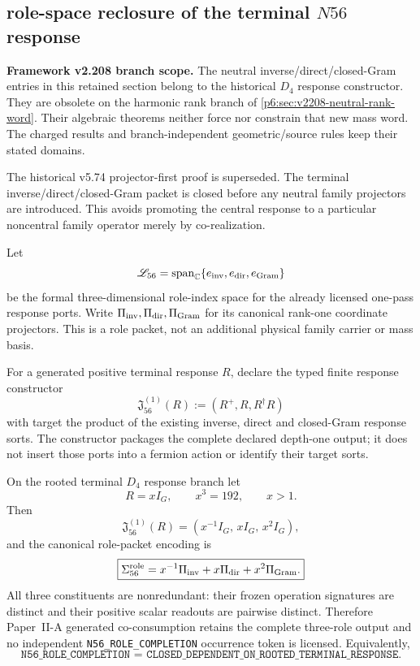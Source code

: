 \documentclass[12pt,a4paper]{article}
\begin{document}
\subsection{role-space reclosure of the terminal \texorpdfstring{$N56$}{N56} response}
\label{p6:sec:v587-n56-role-space-reclosure}

\noindent\textbf{Framework v2.208 branch scope.}
The neutral inverse/direct/closed-Gram entries in this retained section
belong to the historical $D_4$ response constructor. They are obsolete
on the harmonic rank branch of \ref{p6:sec:v2208-neutral-rank-word}.
Their algebraic theorems neither force nor constrain that new mass word.
The charged results and branch-independent geometric/source rules keep
their stated domains.


The historical v5.74 projector-first proof is superseded.  The terminal
inverse/\allowbreak direct/\allowbreak closed-Gram packet is closed before any neutral family
projectors are introduced.  This avoids promoting the central response to a
particular noncentral family operator merely by co-realization.

\begin{definition}
\label{p6:def:v587-terminal-role-space}
Let
\[
 \mathscr L_{56}
 =\operatorname{span}_{\mathbb C}
   \{e_{\rm inv},e_{\rm dir},e_{\rm Gram}\}
\]
be the formal three-dimensional role-index space for the already licensed
one-pass response ports.  Write
\(\Pi_{\rm inv},\Pi_{\rm dir},\Pi_{\rm Gram}\) for its canonical rank-one
coordinate projectors.  This is a role packet, not an additional physical
family carrier or mass basis.
\end{definition}

\begin{definition}
\label{p6:def:v587-terminal-response-jet}
For a generated positive terminal response $R$, declare the typed finite
response constructor
\[
 \mathfrak J_{56}^{(1)}(R)
 :=(R^+,R,R^\dagger R)
\]
with target the product of the existing inverse, direct and closed-Gram
response sorts.  The constructor packages the complete declared depth-one
output; it does not insert those ports into a fermion action or identify their
target sorts.
\end{definition}

\begin{theorem}[Generated closure of the terminal $K=56$ response jet]
\label{p6:thm:v587-n56-response-jet-closure}
On the rooted terminal $D_4$ response branch let
\[
 R=xI_G,\qquad x^3=192,\qquad x>1.
\]
Then
\[
 \mathfrak J_{56}^{(1)}(R)
 =(x^{-1}I_G,\,xI_G,\,x^2I_G),
\]
and the canonical role-packet encoding is
\[
 \boxed{
 \Sigma_{56}^{\rm role}
 =x^{-1}\Pi_{\rm inv}+x\Pi_{\rm dir}+x^2\Pi_{\rm Gram}.}
\]
All three constituents are nonredundant: their frozen operation signatures are
distinct and their positive scalar readouts are pairwise distinct.  Therefore
Paper~II-A generated co-consumption retains the complete three-role output and
no independent \texttt{N56\_ROLE\_COMPLETION} occurrence token is licensed.
Equivalently,
\[
 \boxed{\texttt{N56\_ROLE\_COMPLETION
 = CLOSED\_DEPENDENT\_ON\_ROOTED\_TERMINAL\_RESPONSE}.}
\]
\end{theorem}
\end{document}
